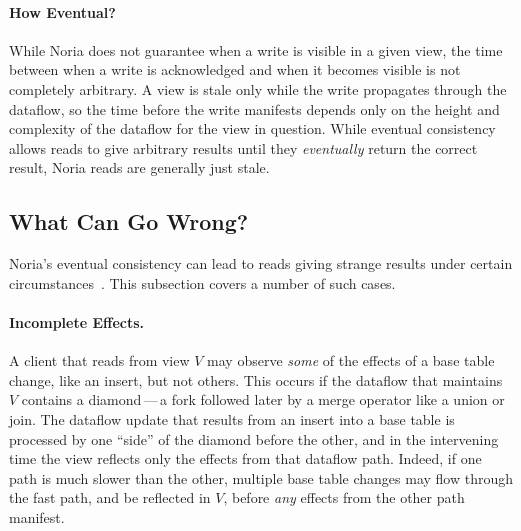 \paragraph{How Eventual?}
While Noria does not guarantee when a write is visible in a given view, the time
between when a write is acknowledged and when it becomes visible is not
completely arbitrary. A view is stale only while the write propagates through
the dataflow, so the time before the write manifests depends only on the height
and complexity of the dataflow for the view in question. While eventual
consistency allows reads to give arbitrary results until they \emph{eventually}
return the correct result, Noria reads are generally just stale.

\subsection{What Can Go Wrong?}

Noria's eventual consistency can lead to reads giving strange results under
certain circumstances~\cite{materialize-eventual}. This subsection covers a
number of such cases.


\paragraph{Incomplete Effects.}
A client that reads from view $V$ may observe \emph{some} of the effects of a
base table change, like an insert, but not others. This occurs if the dataflow
that maintains $V$ contains a diamond\,---\,a fork followed later by a merge
operator like a union or join. The dataflow update that results from an insert
into a base table is processed by one ``side'' of the diamond before the other,
and in the intervening time the view reflects only the effects from that
dataflow path. Indeed, if one path is much slower than the other, multiple base
table changes may flow through the fast path, and be reflected in $V$, before
\emph{any} effects from the other path manifest.

